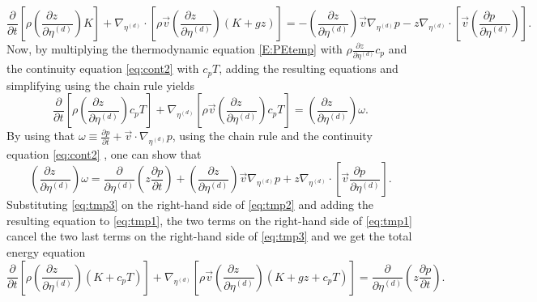 \documentclass{agujournal}
\begin{document}
{\begin{equation}
\frac{\partial }{\partial t}\left[ \rho \left( \frac{\partial z\quad }{\partial \eta^{(d)}}\right)K\right]+\nabla_{\eta^{(d)}} \cdot \left[ \rho \vec{v} \left( \frac{\partial z\quad }{\partial \eta^{(d)}}\right) \left( K+gz \right) \right]=-\left( \frac{\partial z}{\partial \eta^{(d)}}\right)\vec{v} \nabla_{\eta^{(d)}}p - z \nabla_{\eta^{(d)}}\cdot \left[ \vec{v} \left( \frac{\partial p\quad }{\partial \eta^{(d)}}\right)\right].\label{eq:tmp1}
\end{equation}
Now, by multiplying the thermodynamic equation \eqref{E:PEtemp} with $\rho \frac{\partial z\quad }{\partial \eta^{(d)}}c_p$ and the continuity equation \eqref{eq:cont2} with $c_p T$, adding the resulting equations and simplifying using the chain rule yields
\begin{equation}
\frac{\partial }{\partial t}\left[ \rho \left( \frac{\partial z\quad }{\partial \eta^{(d)}}\right)c_p T\right]+\nabla_{\eta^{(d)}} \left[ \rho \vec{v} \left( \frac{\partial z\quad }{\partial \eta^{(d)}}\right)c_p T\right]=\left( \frac{\partial z\quad}{\partial \eta^{(d)}}\right)\omega.\label{eq:tmp2}
\end{equation}
By using that $\omega\equiv \frac{\partial p}{\partial t}+\vec{v} \cdot \nabla_{\eta^{(d)}} p$, using the chain rule and the continuity equation \eqref{eq:cont2} , one can show that
\begin{equation}
\left( \frac{\partial z\quad}{\partial \eta^{(d)}}\right)\omega = \frac{\partial}{\partial \eta^{(d)}}\left( z\frac{\partial p}{\partial t}\right)+\left( \frac{\partial z}{\partial \eta^{(d)}}\right)\vec{v} \nabla_{\eta^{(d)}}p +z \nabla_{\eta^{(d)}}\cdot \left[ \vec{v} \frac{\partial p\quad }{\partial \eta^{(d)}}\right].\label{eq:tmp3}
\end{equation}
Substituting \eqref{eq:tmp3} on the right-hand side of \eqref{eq:tmp2} and adding the resulting equation to \eqref{eq:tmp1}, the two terms on the right-hand side of \eqref{eq:tmp1} cancel the two last terms on the right-hand side of \eqref{eq:tmp3} and we get the total energy equation
\begin{equation}
\frac{\partial }{\partial t}\left[ \rho \left( \frac{\partial z\quad }{\partial \eta^{(d)}}\right)\left(K+c_pT\right)\right]+\nabla_{\eta^{(d)}} \left[ \rho \vec{v} \left( \frac{\partial z\quad }{\partial \eta^{(d)}}\right) \left( K+gz+c_pT \right) \right]=\frac{\partial}{\partial \eta^{(d)}}\left( z\frac{\partial p}{\partial t}\right).\label{eq:Etotp}
\end{equation}
}
\end{document}
